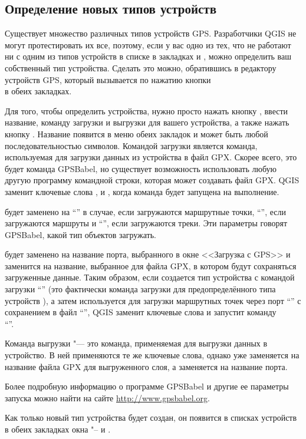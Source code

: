 \subsection{Определение новых типов устройств}\label{sec:Defining-new-device}

Существует множество различных типов устройств GPS. Разработчики QGIS не
могут протестировать их все, поэтому, если у вас одно из тех, что не
работают ни с одним из типов устройств в списке в закладках
 и , можно определить ваш
собственный тип устройства. Сделать это можно, обратившись в редактору
устройств GPS, который вызывается по нажатию кнопки \\
 в обеих закладках.

Для того, чтобы определить устройства, нужно просто нажать кнопку
, ввести название, команду загрузки и выгрузки для
вашего устройства, а также нажать кнопку . Название
появится в меню обеих закладок и может быть любой последовательностью
символов. Командой загрузки является команда, используемая для загрузки
данных из устройства в файл GPX. Скорее всего, это будет команда
GPSBabel, но существует возможность использовать любую другую программу
командной строки, которая может создавать файл GPX. QGIS заменит
ключевые слова ,  и
, когда команда будет запущена на выполнение.

 будет заменено на {}``'' в случае,
если загружаются маршрутные точки, {}``'', если
загружаются маршруты и {}``'', если загружаются треки.
Эти параметры говорят GPSBabel, какой тип объектов загружать.

 будет заменено на название порта, выбранного в окне
<<Загрузка с GPS>> и  заменится на название, выбранное
для файла GPX, в котором будут сохраняться загруженные данные. Таким
образом, если создается тип устройства с командой загрузки
{}``'' (это
фактически команда загрузки для предопределённого типа устройств
), а затем используется
для загрузки маршрутных точек через порт {}``'' с
сохранением в файл {}``'', QGIS заменит ключевые
слова и запустит команду \\
{}``''.

Команда выгрузки "--- это команда, применяемая для выгрузки данных в
устройство. В ней применяются те же ключевые слова, однако
 уже заменяется на название файла GPX для выгруженного
слоя, а  заменяется на название порта.

Более подробную информацию о программе GPSBabel и другие ее параметры
запуска можно найти на сайте \url{http://www.gpsbabel.org}.

Как только новый тип устройства будет создан, он появится в списках
устройств в обеих закладках окна  "-- 
и .

\FloatBarrier
